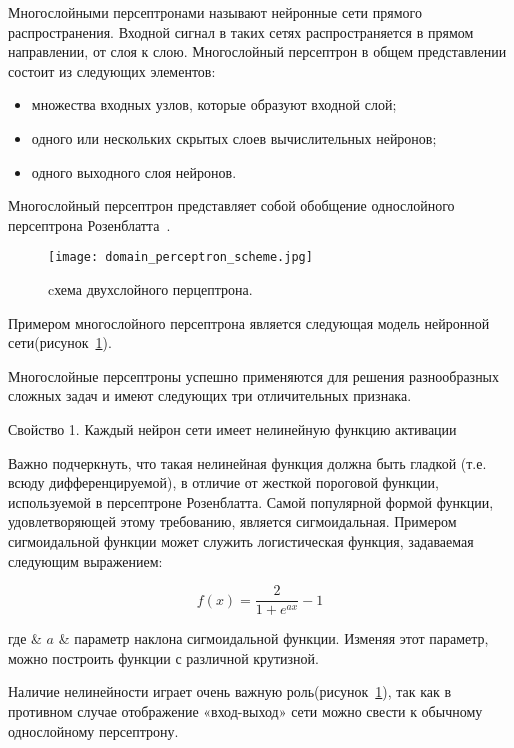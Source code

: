 Многослойными персептронами называют нейронные сети прямого распространения.
Входной сигнал в таких сетях распространяется в прямом направлении, от слоя к слою.
Многослойный персептрон в общем представлении состоит из следующих элементов:

\begin{itemize}
  \item множества входных узлов, которые образуют входной слой;
  \item одного или нескольких скрытых слоев вычислительных нейронов;
  \item одного выходного слоя нейронов.
\end{itemize}

Многослойный персептрон представляет собой обобщение однослойного персептрона Розенблатта~\cite{domain_rosenblatt}.

\begin{figure}[ht]
\centering
  \texttt{[image: domain\_perceptron\_scheme.jpg]}
  \caption{ cхема двухслойного перцептрона. }
  \label{fig:perceptron_scheme}
\end{figure}

Примером многослойного персептрона является следующая модель нейронной сети(рисунок~\ref{fig:perceptron_scheme}).

Многослойные персептроны успешно применяются для решения разнообразных сложных задач и имеют следующих три отличительных признака.

Свойство 1. Каждый нейрон сети имеет нелинейную функцию активации

Важно подчеркнуть, что такая нелинейная функция должна быть гладкой (т.е. всюду дифференцируемой), в отличие от жесткой пороговой функции, используемой в персептроне Розенблатта.
Самой популярной формой функции, удовлетворяющей этому требованию, является сигмоидальная. Примером сигмоидальной функции может служить логистическая функция, задаваемая следующим выражением:

\begin{equation}
  \label{eq:domain:activation_function}
  f(x)=\frac{2}{1+e^{ax}}-1
\end{equation}
\begin{explanation}
  где & $ a $ & параметр наклона сигмоидальной функции. Изменяя этот параметр, можно построить функции с различной крутизной.
\end{explanation}

Наличие нелинейности играет очень важную роль(рисунок~\ref{fig:perceptron_scheme}), так как в противном случае отображение «вход-выход» сети можно свести к обычному однослойному персептрону.

